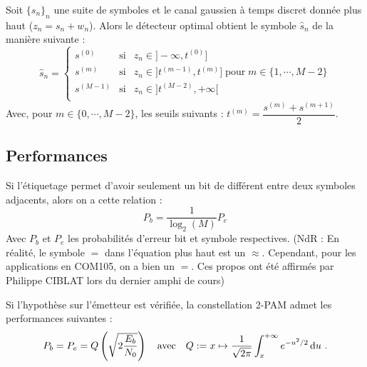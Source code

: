 	\begin{pop}
		Soit $\{s_n\}_n$ une suite de symboles et le canal gaussien à temps discret donnée plus haut ($z_{n} = s_{n} + w_{n}$). Alors le détecteur optimal obtient le symbole $\hat{s}_n$ de la manière suivante :
		$$\hat{s}_n =
		\left\{ \begin{array}{ccl}
			s^{(0)} & \text{si} & z_n\in ]-\infty ,t^{(0)}] \\
			s^{(m)} & \text{si} & z_n\in ]t^{(m-1)} ,t^{(m)}]\;\text{pour}\; m\in \{1,\cdots, M-2\} \\
                        s^{(M-1)} & \text{si} & z_n\in ]t^{(M-2)} ,+\infty[ \\
		\end{array}\right .$$
		Avec, pour $m\in \{0,\cdots,M-2\}$, les seuils suivants : $t^{(m)} = \dfrac{s^{(m)}+s^{(m+1)}}{2}$.
	\end{pop}

\subsection{Performances}
	
	\begin{pop}
		Si l'étiquetage permet d'avoir seulement un bit de différent entre deux symboles adjacents, alors on a cette relation :
		$$P_b=\frac{1}{\log_2(M)}P_e$$
		Avec $P_b$ et $P_e$ les probabilités d'erreur bit et symbole respectives.
		(NdR : En réalité, le symbole $=$ dans l'équation plus haut est un $\approx$. Cependant, pour les applications en COM105, on a bien un $=$. Ces propos ont été affirmés par Philippe CIBLAT lors du dernier amphi de cours)
	\end{pop}	
	
	\begin{pop}
		Si l'hypothèse sur l'émetteur est vérifiée, la constellation 2-PAM admet les performances suivantes :
		$$P_b = P_e = Q \left( \sqrt{2 \frac{E_b}{N_0}} \right) \quad \text{avec} \quad Q := x \mapsto \frac{1}{\sqrt{2\pi}} \int_x^{+\infty} e^{-u^2/2} \mathop{}\mathopen{}\mathrm{d} u\ .$$
	\end{pop}
	
